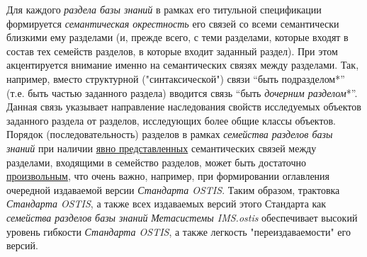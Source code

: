 \begin{SCn}
{	Для каждого \textit{раздела базы знаний} в рамках его титульной спецификации формируется \textit{семантическая окрестность} его связей со всеми семантически близкими ему разделами (и, прежде всего, с теми разделами, которые входят в состав тех семейств разделов, в которые входит заданный раздел). При этом акцентируется внимание именно на семантических связях между разделами. Так, например, вместо структурной ("синтаксической"{}) связи ``быть подразделом*''{} (т.е. быть частью заданного раздела) вводится связь ``быть \textit{дочерним разделом}*''{}. \\
	Данная связь указывает направление наследования свойств исследуемых объектов заданного раздела от разделов, исследующих более общие классы объектов.
	Порядок (последовательность) разделов в рамках \textit{семейства разделов базы знаний} при наличии \uline{явно представленных} семантических связей между разделами, входящими в семейство разделов, может быть достаточно \uline{произвольным}, что очень важно, например, при формировании оглавления очередной издаваемой версии \textit{Стандарта OSTIS}. Таким образом, трактовка \textit{Стандарта OSTIS}, а также всех издаваемых версий этого Стандарта как \textit{семейства разделов базы знаний} \scnbigskip \textit{Метасистемы IMS.ostis} обеспечивает высокий уровень гибкости \textit{Стандарта OSTIS}, а также легкость "переиздаваемости"{} его версий.}



\end{SCn}
